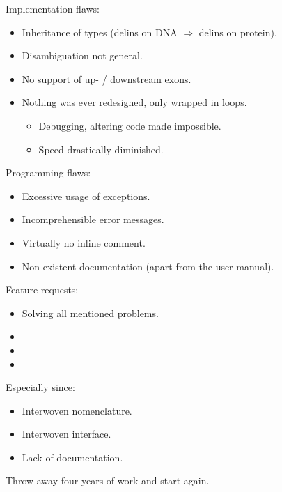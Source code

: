 \documentclass[slidestop]{beamer}
\begin{document}
\begin{frame}
  Implementation flaws:
  \begin{itemize}
    \item Inheritance of types (delins on DNA $\Rightarrow$ delins on protein).
    \item Disambiguation not general.
    \item No support of up- / downstream exons.
    \item Nothing was ever redesigned, only wrapped in loops.
    \begin{itemize}
      \item Debugging, altering code made impossible.
      \item Speed drastically diminished.
    \end{itemize}
  \end{itemize}
  \bigskip
  \pause

  Programming flaws:
  \begin{itemize}
    \item Excessive usage of exceptions.
    \item Incomprehensible error messages.
    \item Virtually no inline comment.
    \item Non existent documentation (apart from the user manual).
  \end{itemize}
\end{frame}

\begin{frame}
  Feature requests:
  \begin{itemize}
    \item Solving all mentioned problems.
    \item {}
    \item {}
    \item {}
  \end{itemize}
  \bigskip
  \pause

  Especially since:
  \begin{itemize}
    \item Interwoven nomenclature.
    \item Interwoven interface.
    \item Lack of documentation.
  \end{itemize}
  \bigskip
  \pause

  Throw away four years of work and start again.
\end{frame}
\end{document}
